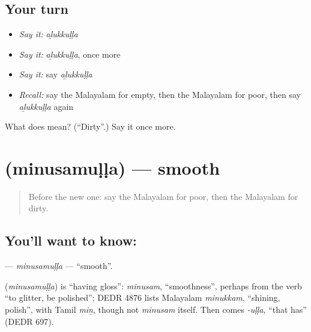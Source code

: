 \subsection*{Your turn}
\begin{itemize}
\raggedright
  \item \emph{Say it:} \emph{aḻukkuḷḷa}
  \item \emph{Say it:} \emph{aḻukkuḷḷa}, once more
  \item \emph{Say it:} say \emph{aḻukkuḷḷa}
  \item \emph{Recall:} say the Malayalam for empty, then the Malayalam for poor, then say \emph{aḻukkuḷḷa} again
\end{itemize}

\begin{tcolorbox}[breakable,colback=teal!4,colframe=teal!35!black,title={Before you move on}]
What does  mean? (\textquotedblleft{}Dirty\textquotedblright{}.) Say it once more.
\end{tcolorbox}
\section[\texorpdfstring{\ml{മിനുസമുള്ള} (minusamuḷḷa)}{മിനുസമുള്ള (minusamuḷḷa)}]{ (minusamuḷḷa) — smooth}

\label{lesson:ML-C204-minusamulla}



\begin{quote}
Before the new one: say the Malayalam for poor, then the Malayalam for dirty.
\end{quote}

\subsection*{You'll want to know: }
\textbf{} — \emph{minusamuḷḷa} — \textquotedblleft{}smooth\textquotedblright{}.

\begin{cousinweb}
\textbf{} (\emph{minusamuḷḷa}) is \textquotedblleft{}having gloss\textquotedblright{}: \emph{minusam}, \textquotedblleft{}smoothness\textquotedblright{}, perhaps from the verb \textquotedblleft{}to glitter, be polished\textquotedblright{}; DEDR 4876 lists Malayalam \emph{minukkam}, \textquotedblleft{}shining, polish\textquotedblright{}, with Tamil \emph{miṉ}, though not \emph{minusam} itself. Then comes \emph{-uḷḷa}, \textquotedblleft{}that has\textquotedblright{} (DEDR 697).
\end{cousinweb}

